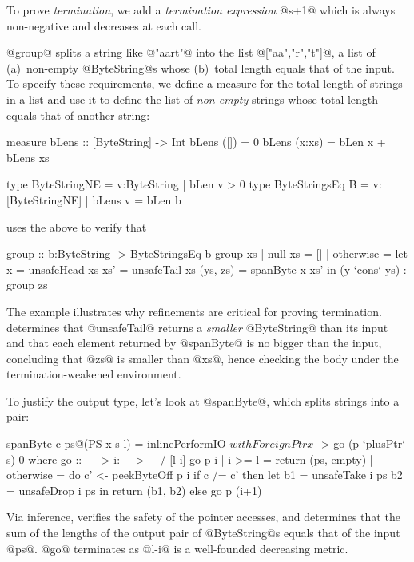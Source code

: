 To prove \emph{termination}, we add a \emph{termination expression} 
@s+1@ which is always non-negative and decreases at each call.

@group@ splits a string like @"aart"@ into the list
@["aa","r","t"]@, \ie a list of
(a)~non-empty @ByteString@s whose 
(b)~total length equals that of the input. 
To specify these requirements, we define a measure for 
the total length of strings in a list and use it to
define the list of \emph{non-empty} strings
whose total length equals that of another string:

\begin{code}
  measure bLens :: [ByteString] -> Int 
  bLens ([])     = 0
  bLens (x:xs)   = bLen x + bLens xs
  
  type ByteStringNE    = {v:ByteString | bLen v > 0}
  type ByteStringsEq B = {v:[ByteStringNE] | bLens v = bLen b}
\end{code}
%
\toolname uses the above to verify that
%
\begin{code}
  group :: b:ByteString -> ByteStringsEq b
  group xs
   | null xs   = []
   | otherwise = let x        = unsafeHead xs
                     xs'      = unsafeTail xs
                     (ys, zs) = spanByte x xs' 
                 in (y `cons` ys) : group zs
\end{code}
%
The example illustrates why refinements are critical for
proving termination. \toolname determines that @unsafeTail@ 
returns a \emph{smaller} @ByteString@ than its input and that
each element returned by @spanByte@ is no bigger than the 
input, concluding that @zs@ is smaller than @xs@, hence
checking the body under the termination-weakened environment.

To justify the output type, let's look at @spanByte@,
which splits strings into a pair:
%
\begin{code}
  spanByte c ps@(PS x s l) 
    = inlinePerformIO $ withForeignPtr x $
          \p -> go (p `plusPtr` s) 0
    where
      go :: _ -> i:_ -> _ / [l-i]
      go p i 
        | i >= l    = return (ps, empty)
        | otherwise = do
            c' <- peekByteOff p i
            if c /= c'
              then let b1 = unsafeTake i ps
                       b2 = unsafeDrop i ps
                   in  return (b1, b2)
              else go p (i+1)
\end{code}
%
Via inference, \toolname verifies the safety of 
the pointer accesses, and determines that the 
sum of the lengths of the output pair of 
@ByteString@s equals that of the input @ps@.
@go@ terminates as @l-i@ is a well-founded 
decreasing metric.

